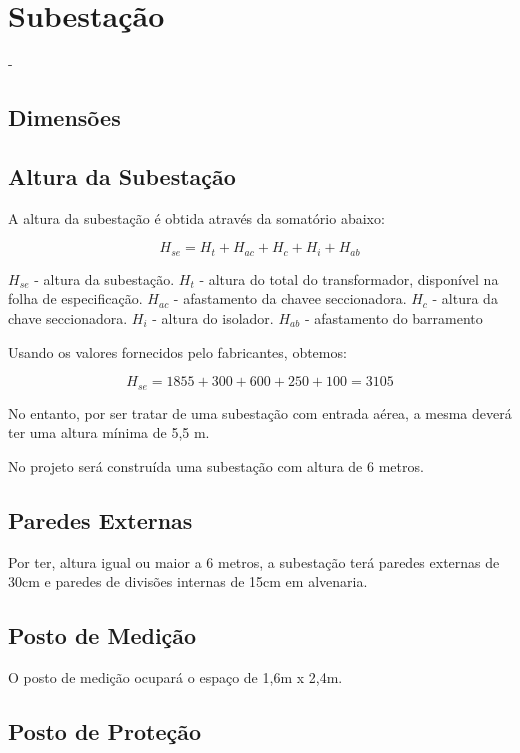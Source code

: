 \section{Subestação}
-

\subsection{Dimensões}

\subsection{Altura da Subestação}

A altura da subestação é obtida através da somatório abaixo:

\begin{equation}
H_{se} = H_t + H_{ac} + H_c + H_i + H_{ab}
\end{equation}

$H_{se}$ - altura da subestação.
$H_t$ - altura do total do transformador, disponível na folha de especificação.
$H_{ac}$ - afastamento da chavee seccionadora.
$H_c$ - altura da chave seccionadora.
$H_i$ - altura do isolador.
$H_{ab}$ - afastamento do barramento

Usando os valores fornecidos pelo fabricantes, obtemos:

\begin{equation}
H_{se} = 1855 + 300 + 600 + 250 + 100 = 3105
\end{equation}

No entanto, por ser tratar de uma subestação com entrada aérea, a mesma deverá ter uma altura mínima de 5,5 m.

No projeto será construída uma subestação com altura de 6 metros.

\subsection{Paredes Externas}

Por ter, altura igual ou maior a 6 metros, a subestação terá paredes externas de 30cm e paredes de divisões internas de 15cm em alvenaria.


\subsection{Posto de Medição}

O posto de medição ocupará o espaço de 1,6m x 2,4m.

\subsection{Posto de Proteção}

